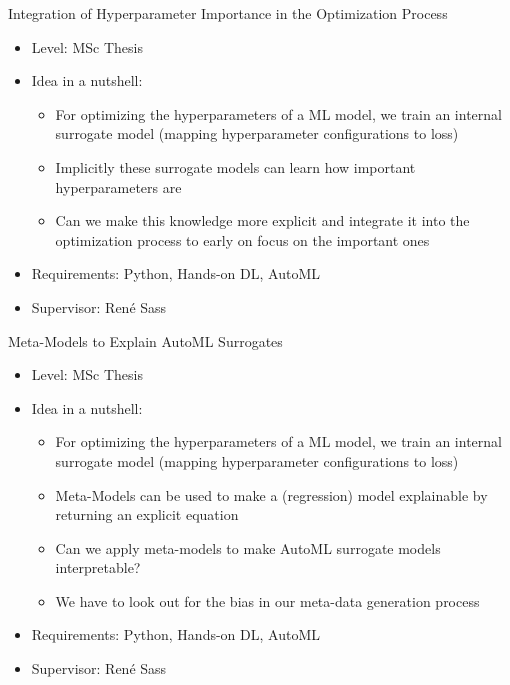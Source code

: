 \documentclass[aspectratio=169]{../latex_main/tntbeamer}  %
\begin{document}
\begin{frame}[c]{Integration of Hyperparameter Importance in the Optimization Process}
 
	\begin{itemize}
		\item Level: MSc Thesis
		\item Idea in a nutshell:
		\begin{itemize}
		    \item For optimizing the hyperparameters of a ML model, we train an internal surrogate model (mapping hyperparameter configurations to loss)
		    \item Implicitly these surrogate models can learn how important hyperparameters are 
		    \item Can we make this knowledge more explicit and integrate it into the optimization process to early on focus on the important ones
		\end{itemize}
		\item Requirements: Python, Hands-on DL, AutoML
		\item Supervisor: Ren\'e Sass
	\end{itemize}
\end{frame}

\begin{frame}[c]{Meta-Models to Explain AutoML Surrogates}
 
	\begin{itemize}
		\item Level: MSc Thesis
		\item Idea in a nutshell:
		\begin{itemize}
		    \item For optimizing the hyperparameters of a ML model, we train an internal surrogate model (mapping hyperparameter configurations to loss)
		    \item Meta-Models can be used to make a (regression) model explainable by returning an explicit equation
		    \item Can we apply meta-models to make AutoML surrogate models interpretable?
		    \item We have to look out for the bias in our meta-data generation process
		\end{itemize}
		\item Requirements: Python, Hands-on DL, AutoML
		\item Supervisor: Ren\'e Sass
	\end{itemize}
\end{frame}
\end{document}

